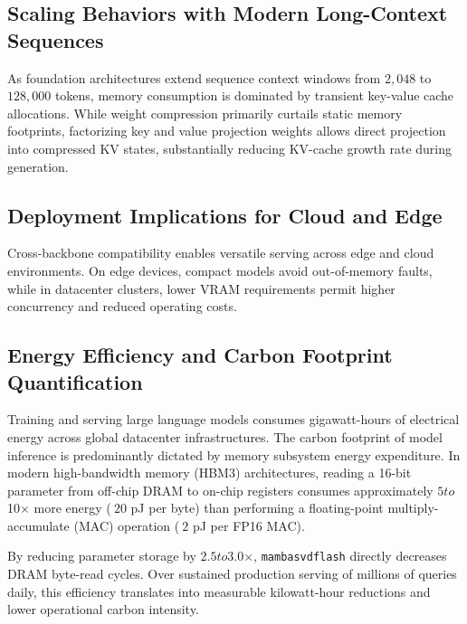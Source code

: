 \subsection{Scaling Behaviors with Modern Long-Context Sequences}
As foundation architectures extend sequence context windows from $2{,}048$ to $128{,}000$ tokens, memory consumption is dominated by transient key-value cache allocations. While weight compression primarily curtails static memory footprints, factorizing key and value projection weights allows direct projection into compressed KV states, substantially reducing KV-cache growth rate during generation.

\subsection{Deployment Implications for Cloud and Edge}
Cross-backbone compatibility enables versatile serving across edge and cloud environments. On edge devices, compact models avoid out-of-memory faults, while in datacenter clusters, lower VRAM requirements permit higher concurrency and reduced operating costs.

\subsection{Energy Efficiency and Carbon Footprint Quantification}
Training and serving large language models consumes gigawatt-hours of electrical energy across global datacenter infrastructures. The carbon footprint of model inference is predominantly dictated by memory subsystem energy expenditure. In modern high-bandwidth memory (HBM3) architectures, reading a 16-bit parameter from off-chip DRAM to on-chip registers consumes approximately $5$\times$ to $10$\times$ more energy ($~20$ pJ per byte) than performing a floating-point multiply-accumulate (MAC) operation ($~2$ pJ per FP16 MAC).

By reducing parameter storage by $2.5$\times$ to $3.0$\times$, \texttt{mambasvdflash} directly decreases DRAM byte-read cycles. Over sustained production serving of millions of queries daily, this efficiency translates into measurable kilowatt-hour reductions and lower operational carbon intensity.
